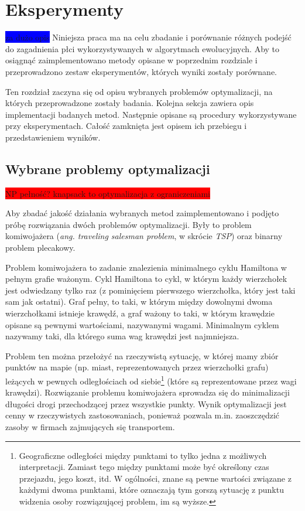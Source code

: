 \documentclass[twoside]{iisthesis}
\newcommand{\todo}{\colorbox{red}}
\newcommand{\fixme}{\colorbox{blue}}
\begin{document}
\chapter{Eksperymenty} \label{chapter:experiments}
\fixme{za dużo opis}
Niniejsza praca ma na celu zbadanie i porównanie różnych podejść do zagadnienia płci wykorzystywanych w algorytmach ewolucyjnych.
Aby to osiągnąć zaimplementowano metody opisane w poprzednim rozdziale i przeprowadzono zestaw eksperymentów, których wyniki zostały porównane.

Ten rozdział zaczyna się od opisu wybranych problemów optymalizacji, na których przeprowadzone zostały badania. Kolejna sekcja zawiera opis implementacji badanych metod. Następnie opisane są procedury wykorzystywane przy eksperymentach. Całość zamknięta jest opisem ich przebiegu i przedstawieniem wyników.

\section{Wybrane problemy optymalizacji}

\todo{NP pełność? knapsack to optymalizacja z ograniczeniami}

Aby zbadać jakość działania wybranych metod zaimplementowano i podjęto próbę rozwiązania dwóch problemów optymalizacji. 
Były to problem komiwojażera (\emph{ang. traveling salesman problem}, w skrócie \emph{TSP}) oraz binarny problem plecakowy.

Problem komiwojażera to zadanie znalezienia minimalnego cyklu Hamiltona w pełnym grafie ważonym. 
Cykl Hamiltona to cykl, w którym każdy wierzchołek jest odwiedzany tylko raz (z pominięciem pierwszego wierzchołka, który jest taki sam jak ostatni). 
Graf pełny, to taki, w którym między dowolnymi dwoma wierzchołkami istnieje krawędź, a graf ważony to taki, w którym krawędzie opisane są pewnymi wartościami, nazywanymi wagami. 
Minimalnym cyklem nazywamy taki, dla którego suma wag krawędzi jest najmniejsza.

Problem ten można przełożyć na rzeczywistą sytuację, w której mamy zbiór punktów na mapie (np. miast, reprezentowanych przez wierzchołki grafu) leżących w pewnych odległościach od siebie\footnote{
	Geograficzne odległości między punktami to tylko jedna z możliwych interpretacji.
	Zamiast tego między punktami może być określony czas przejazdu, jego koszt, itd.
	W ogólności, znane są pewne wartości związane z każdymi dwoma punktami, które oznaczają tym gorszą sytuację z punktu widzenia osoby rozwiązującej problem, im są wyższe.
} (które są reprezentowane przez wagi krawędzi). 
Rozwiązanie problemu komiwojażera sprowadza się do minimalizacji długości drogi przechodzącej przez wszystkie punkty. 
Wynik optymalizacji jest cenny w rzeczywistych zastosowaniach, ponieważ pozwala m.in. zaoszczędzić zasoby w firmach zajmujących się transportem.
\end{document}
